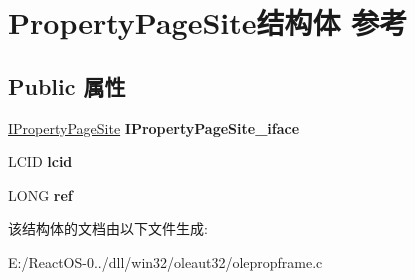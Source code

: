 \hypertarget{struct_property_page_site}{}\section{Property\+Page\+Site结构体 参考}
\label{struct_property_page_site}
\subsection*{Public 属性}
\begin{DoxyCompactItemize}
\item 
\mbox{\label{struct_property_page_site_a28228ec3554221f61356624c74cded25}} 
\hyperlink{interface_i_property_page_site}{I\+Property\+Page\+Site} {\bfseries I\+Property\+Page\+Site\+\_\+iface}
\item 
\mbox{\label{struct_property_page_site_a78ac72be7a2840087643284a97ef3709}} 
L\+C\+ID {\bfseries lcid}
\item 
\mbox{\label{struct_property_page_site_ae141daf4203411ab89ab6d5ed3adb093}} 
L\+O\+NG {\bfseries ref}
\end{DoxyCompactItemize}


该结构体的文档由以下文件生成\+:\begin{DoxyCompactItemize}
\item 
E\+:/\+React\+O\+S-\/0../dll/win32/oleaut32/olepropframe.\+c\end{DoxyCompactItemize}
